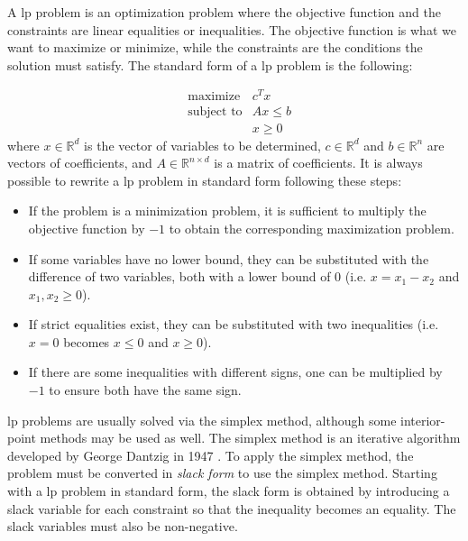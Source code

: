 A \gls{lp} problem is an optimization problem where the objective function and the constraints are linear equalities or inequalities.
The objective function is what we want to maximize or minimize, while the constraints are the conditions the solution must satisfy.
The standard form of a \gls{lp} problem is the following:

\begin{equation*}
    \begin{aligned}
         & \text{maximize}   & c^T x      \\
         & \text{subject to} & A x \leq b \\
         &                   & x \geq 0
    \end{aligned}
\end{equation*}
where $x \in \mathbb{R}^d$ is the vector of variables to be determined, $c \in \mathbb{R}^d$ and $b \in \mathbb{R}^n$ are vectors of coefficients, and $A \in \mathbb{R}^{n \times d}$ is a matrix of coefficients.
It is always possible to rewrite a \gls{lp} problem in standard form following these steps:
\begin{itemize}
    \item If the problem is a minimization problem, it is sufficient to multiply the objective function by $-1$ to obtain the corresponding maximization problem.
    \item If some variables have no lower bound, they can be substituted with the difference of two variables, both with a lower bound of $0$ (i.e. $x = x_1 - x_2$ and $x_1, x_2 \geq 0$).
    \item If strict equalities exist, they can be substituted with two inequalities (i.e. $x = 0$ becomes $x \leq 0$ and $x \geq 0$).
    \item If there are some inequalities with different signs, one can be multiplied by $-1$ to ensure both have the same sign.
\end{itemize}

\gls{lp} problems are usually solved via the simplex method, although some interior-point methods \cite{paper:interior-point} may be used as well.
The simplex method is an iterative algorithm developed by George Dantzig in 1947 \cite{paper:simplex}.
To apply the simplex method, the problem must be converted in \textit{slack form} to use the simplex method.
Starting with a \gls{lp} problem in standard form, the slack form is obtained by introducing a slack variable for each constraint so that the inequality becomes an equality.
The slack variables must also be non-negative.

